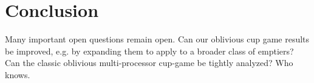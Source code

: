 \documentclass[twocolumn]{article}[10pt]
\begin{document}


\section{Conclusion}
Many important open questions remain open. Can our oblivious cup game results
be improved, e.g. by expanding them to apply to a broader class of emptiers?
Can the classic oblivious multi-processor cup-game be tightly analyzed?
Who knows.



\end{document}
